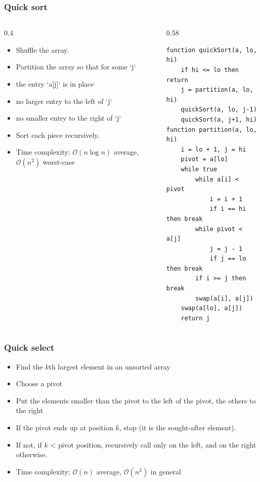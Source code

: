 \documentclass[8pt,aspectratio=169]{beamer}
\begin{document}
\begin{frame}[fragile]
\frametitle{Quick sort}
\begin{columns}[T]
\begin{column}{0.4\textwidth}
\begin{itemize}
    \item Shuffle the array.
    \item Partition the array so that for some `j`
    \item the entry `a[j]` is in place
    \item no larger entry to the left of `j`
    \item no smaller entry to the right of `j`
    \item Sort each piece recursively.
    \item Time complexity: $\mathcal{O}(n\log n)$ average, $\mathcal{O}(n^2)$ worst-case
\end{itemize}

\end{column}
\begin{column}{0.58\textwidth}
    \begin{lstlisting}[basicstyle=\tiny\ttfamily, frame=single]
function quickSort(a, lo, hi)
    if hi <= lo then return
    j = partition(a, lo, hi)
    quickSort(a, lo, j-1)
    quickSort(a, j+1, hi)
function partition(a, lo, hi)
    i = lo + 1, j = hi
    pivot = a[lo]
    while true
        while a[i] < pivot
            i = i + 1
            if i == hi then break
        while pivot < a[j]
            j = j - 1
            if j == lo then break
        if i >= j then break
        swap(a[i], a[j])
    swap(a[lo], a[j])
    return j
\end{lstlisting}
\end{column}
\end{columns}
\end{frame}

\begin{frame}
\frametitle{Quick select}
\begin{itemize}
	\item Find the $k$th largest element in an unsorted array
	\item Choose a pivot
	\item Put the elements smaller than the pivot to the left of the pivot, the others to the right
	\item If the pivot ends up at position $k$, stop (it is the sought-after element).
	\item If not, if $k$ < pivot position, recursively call only on the left, and on the right otherwise.
	\item Time complexity: $\mathcal{O}(n)$ average, $\mathcal{O}(n^2)$ in general
\end{itemize}
\end{frame}
\end{document}
